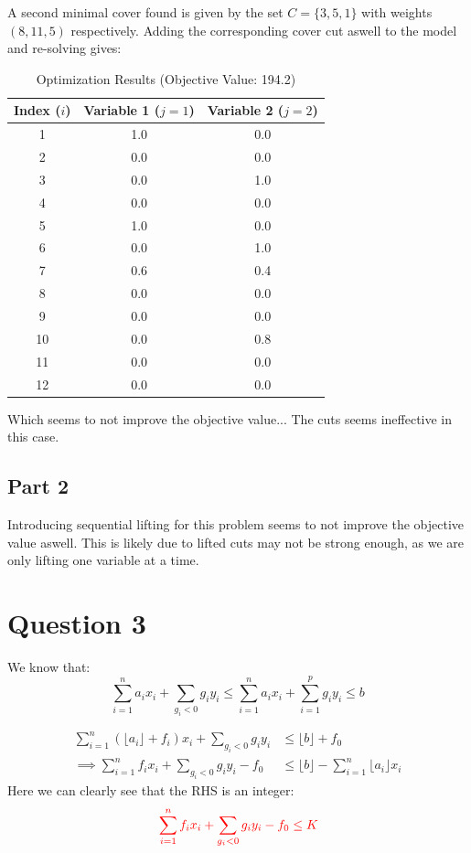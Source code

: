 \documentclass{article}
\begin{document}
    A second minimal cover found is given by the set $C = \{3,5,1\}$ with weights $(8,11,5)$ respectively.
    Adding the corresponding cover cut aswell to the model and re-solving gives:
    \begin{table}[H]
        \centering
        \caption{Optimization Results (Objective Value: 194.2)}
        \label{tab:optimization_results_3}
        \begin{tabular}{ccc}
            \toprule
            \textbf{Index ($i$)} & \textbf{Variable 1 ($j=1$)} & \textbf{Variable 2 ($j=2$)} \\
            \midrule
            1  & 1.0 & 0.0 \\
            2  & 0.0 & 0.0 \\
            3  & 0.0 & 1.0 \\
            4  & 0.0 & 0.0 \\
            5  & 1.0 & 0.0 \\
            6  & 0.0 & 1.0 \\
            7  & 0.6 & 0.4 \\
            8  & 0.0 & 0.0 \\
            9  & 0.0 & 0.0 \\
            10 & 0.0 & 0.8 \\
            11 & 0.0 & 0.0 \\
            12 & 0.0 & 0.0 \\
            \bottomrule
        \end{tabular}
    \end{table}
    Which seems to not improve the objective value... The cuts seems ineffective in this case.

    \subsection*{Part 2}
    Introducing sequential lifting for this problem seems to not improve the objective value aswell.
    This is likely due to lifted cuts may not be strong enough, as we are only lifting one variable at a time.

\section*{Question 3}
We know that:
\[
    \sum_{i=1}^{n} a_i x_i + \sum_{g_i < 0} g_i y_i \leq \sum_{i=1}^{n} a_i x_i + \sum_{i=1}^{p} g_i y_i \leq b
\]

\begin{align*}
    \sum_{i=1}^{n} \left( \lfloor a_i \rfloor + f_i \right) x_i + \sum_{g_i < 0} g_i y_i  &\leq \lfloor b \rfloor + f_0 \\
    \implies \sum_{i=1}^{n} f_i x_i + \sum_{g_i < 0} g_i y_i - f_0  &\leq \lfloor b \rfloor - \sum_{i=1}^{n} \lfloor a_i \rfloor x_i
\end{align*}
Here we can clearly see that the RHS is an integer: 
\[
\color{red}{}\sum_{i=1}^{n} f_i x_i + \sum_{g_i < 0} g_i y_i - f_0  \leq K\\
\]
\end{document}
